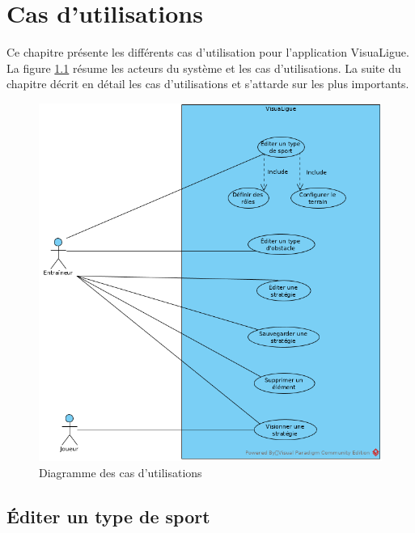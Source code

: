 
\chapter{Cas d'utilisations}
\label{s:cas_utilisation}

Ce chapitre présente les différents cas d'utilisation pour l'application VisuaLigue.
La figure \ref{fig:cas_utilisation_diag} résume les acteurs du système et les cas d'utilisations.
La suite du chapitre décrit en détail les cas d'utilisations et s'attarde sur les plus importants.

\begin{figure}[htpb]
    \centering
    \includegraphics[scale=0.7]{fig/cas_utilisation_diag.png}
    \caption{Diagramme des cas d'utilisations}
    \label{fig:cas_utilisation_diag}
\end{figure}

\newpage



\section{Éditer un type de sport}
\label{sec:ajouter_un_type_de_sport}

